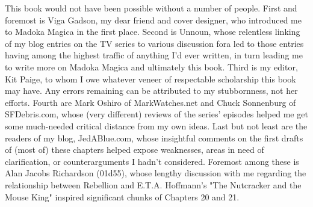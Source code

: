 This book would not have been possible without a number of people. First and foremost is Viga Gadson, my dear friend and cover designer, who introduced me to Madoka Magica in the first place. Second is Unnoun, whose relentless linking of my blog entries on the TV series to various discussion fora led to those entries having among the highest traffic of anything I'd ever written, in turn leading me to write more on Madoka Magica and ultimately this book. Third is my editor, Kit Paige, to whom I owe whatever veneer of respectable scholarship this book may have. Any errors remaining can be attributed to my stubbornness, not her efforts. Fourth are Mark Oshiro of MarkWatches.net and Chuck Sonnenburg of SFDebris.com, whose (very different) reviews of the series' episodes helped me get some much-needed critical distance from my own ideas. Last but not least are the readers of my blog, JedABlue.com, whose insightful comments on the first drafts of (most of) these chapters helped expose weaknesses, areas in need of clarification, or counterarguments I hadn't considered. Foremost among these is Alan Jacobs Richardson (01d55), whose lengthy discussion with me regarding the relationship between Rebellion and E.T.A. Hoffmann's "The Nutcracker and the Mouse King" \cite{ref11} inspired significant chunks of Chapters 20 and 21.